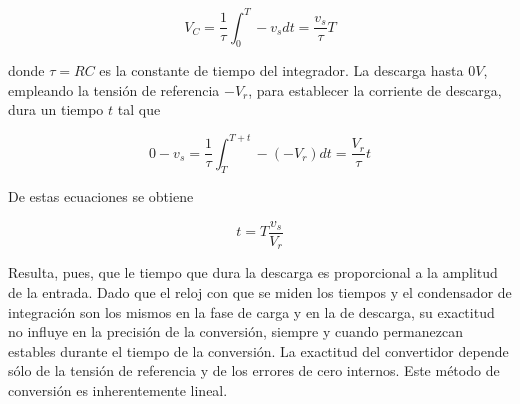 \begin{equation}
    V_C = \frac{1}{\tau} \int_{0}^{T} - v_s dt = \frac{v_s}{\tau}T
\end{equation}

donde $\tau = R C$ es la constante de tiempo del integrador. La descarga hasta $0 V$, empleando la tensión de referencia $-V_r$, para establecer la corriente de descarga, dura un tiempo $t$ tal que

\begin{equation}
    0 - v_s = \frac{1}{\tau} \int_{T}^{T + t} -(-V_r)dt = \frac{V_r}{\tau} t
\end{equation}

De estas ecuaciones se obtiene

\begin{equation}
    t = T \frac{v_s}{V_r}
\end{equation}

Resulta, pues, que le tiempo que dura la descarga es proporcional a la amplitud de la entrada. Dado que el reloj con que se miden los tiempos y el condensador de integración son los mismos en la fase de carga y en la de descarga, su exactitud no influye en la precisión de la conversión, siempre y cuando permanezcan estables durante el tiempo de la conversión. La exactitud del convertidor depende sólo de la tensión de referencia y de los errores de cero internos. Este método de conversión es inherentemente lineal.
